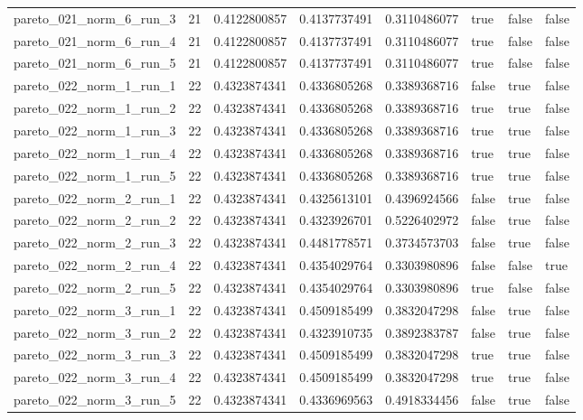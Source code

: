 \begin{tabular}{@{}llllllll@{}}
pareto\_021\_norm\_6\_run\_3 & 21 & 0.4122800857 & 0.4137737491 & 0.3110486077 & true & false & false \\
pareto\_021\_norm\_6\_run\_4 & 21 & 0.4122800857 & 0.4137737491 & 0.3110486077 & true & false & false \\
pareto\_021\_norm\_6\_run\_5 & 21 & 0.4122800857 & 0.4137737491 & 0.3110486077 & true & false & false \\
pareto\_022\_norm\_1\_run\_1 & 22 & 0.4323874341 & 0.4336805268 & 0.3389368716 & false & true & false \\
pareto\_022\_norm\_1\_run\_2 & 22 & 0.4323874341 & 0.4336805268 & 0.3389368716 & true & true & false \\
pareto\_022\_norm\_1\_run\_3 & 22 & 0.4323874341 & 0.4336805268 & 0.3389368716 & true & true & false \\
pareto\_022\_norm\_1\_run\_4 & 22 & 0.4323874341 & 0.4336805268 & 0.3389368716 & true & true & false \\
pareto\_022\_norm\_1\_run\_5 & 22 & 0.4323874341 & 0.4336805268 & 0.3389368716 & true & true & false \\
pareto\_022\_norm\_2\_run\_1 & 22 & 0.4323874341 & 0.4325613101 & 0.4396924566 & false & true & false \\
pareto\_022\_norm\_2\_run\_2 & 22 & 0.4323874341 & 0.4323926701 & 0.5226402972 & false & true & false \\
pareto\_022\_norm\_2\_run\_3 & 22 & 0.4323874341 & 0.4481778571 & 0.3734573703 & false & true & false \\
pareto\_022\_norm\_2\_run\_4 & 22 & 0.4323874341 & 0.4354029764 & 0.3303980896 & false & false & true \\
pareto\_022\_norm\_2\_run\_5 & 22 & 0.4323874341 & 0.4354029764 & 0.3303980896 & true & false & false \\
pareto\_022\_norm\_3\_run\_1 & 22 & 0.4323874341 & 0.4509185499 & 0.3832047298 & false & true & false \\
pareto\_022\_norm\_3\_run\_2 & 22 & 0.4323874341 & 0.4323910735 & 0.3892383787 & false & true & false \\
pareto\_022\_norm\_3\_run\_3 & 22 & 0.4323874341 & 0.4509185499 & 0.3832047298 & true & true & false \\
pareto\_022\_norm\_3\_run\_4 & 22 & 0.4323874341 & 0.4509185499 & 0.3832047298 & true & true & false \\
pareto\_022\_norm\_3\_run\_5 & 22 & 0.4323874341 & 0.4336969563 & 0.4918334456 & false & true & false \\

\end{tabular}
